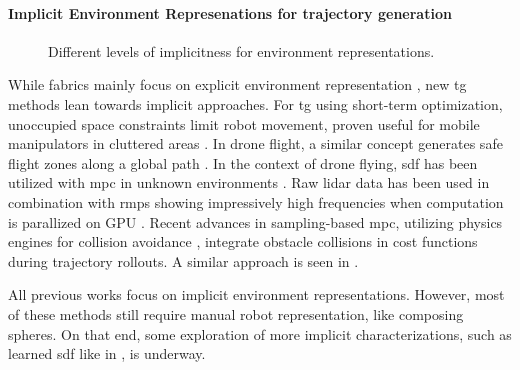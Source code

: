 \paragraph{Implicit Environment Represenations for trajectory generation}

\begin{figure}
  \centering
  
  \caption{Different levels of implicitness for environment representations.}
  \label{fig:ral24_overview}
\end{figure}

While \ac{fabrics} mainly focus on explicit environment
representation \cite{Spahn2023,Ratliff2020}, new \ac{tg}
methods lean towards implicit approaches. For \ac{tg} using
short-term optimization, unoccupied space constraints limit
robot movement, proven useful for mobile manipulators in
cluttered areas \cite{Spahn2021}. In drone flight, a similar
concept generates safe flight zones along a global path
\cite{Liu2017a,Tordesillas2019a}. In the context of drone
flying, \ac{sdf} has been utilized with \ac{mpc} in unknown
environments \cite{Oleynikova2017voxblox}. Raw lidar data
has been used in combination with \acp{rmp} showing
impressively high frequencies when computation is parallized
on GPU \cite{Pantic2023obstacle}. Recent advances in
sampling-based \ac{mpc}, utilizing physics engines for
collision avoidance \cite{Pezzato2023sampling}, integrate
obstacle collisions in cost functions during trajectory
rollouts. A similar approach is seen in
\cite{Sundaralingam2023curobo}.

All previous works focus on implicit environment
representations. However, most of these methods still
require manual robot representation, like composing spheres.
On that end, some exploration of more implicit
characterizations, such as learned \ac{sdf} like in
\cite{Liu2022regularized,Koptev2023neural}, is underway.
